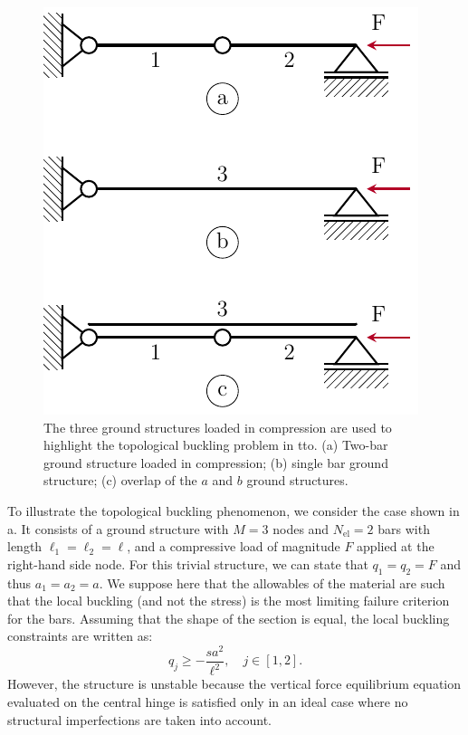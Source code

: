 \begin{figure}
    \centering
    \includegraphics{figures/04_TTO_improvements/01_3_bars_chain/3_bars_chain.pdf}
    \caption{The three ground structures loaded in compression are used to highlight the topological buckling problem in \gls{tto}. (a) Two-bar ground structure loaded in compression; (b) single bar ground structure; (c) overlap of the $a$ and $b$ ground structures.}
    \label{fig:04_chain_buck}
\end{figure}

To illustrate the topological buckling phenomenon, we consider the case shown in a. It consists of a ground structure with $M=3$ nodes and $N_{\text{el}}=2$ bars with length $\ell_1=\ell_2=\ell$, and a compressive load of magnitude $F$ applied at the right-hand side node. For this trivial structure, we can state that $q_1=q_2=F$ and thus $a_1=a_2=a$. We suppose here that the allowables of the material are such that the local buckling (and not the stress) is the most limiting failure criterion for the bars. Assuming that the shape of the section is equal, the local buckling constraints are written as:
\begin{equation}
    q_j\geq -\frac{s a^2}{\ell^2}, \quad j\in[1,2].
    \label{eq:04_chain_1}
\end{equation}
However, the structure is unstable because the vertical force equilibrium equation evaluated on the central hinge is satisfied only in an ideal case where no structural imperfections are taken into account.

